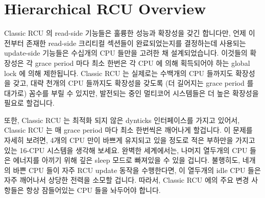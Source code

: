 
\section{Hierarchical RCU Overview}
\label{app:rcuimpl:rcutree:Hierarchical RCU Overview}

Classic RCU 의 read-side 기능들은 훌륭한 성능과 확장성을 갖긴 합니다만, 언제
이전부터 존재한 read-side 크리티컬 섹션들이 완료되었는지를 결정하는데 사용되는
update-side 기능들은 수십개의 CPU 들만을 고려한 채 설계되었습니다.
이것들의 확장성은 각 grace period 마다 최소 한번은 각 CPU 에 의해 획득되어야
하는 global lock 에 의해 제한됩니다.
Classic RCU 는 실제로는 수백개의 CPU 들까지도 확장성을 갖고, 대략 천개의 CPU
들까지도 확장성을 갖도록 (더 길어지는 grace period 를 대가로) 꼼수를 부릴 수
있지만, 발전되는 중인 멀티코어 시스템들은 더 높은 확장성을 필요로 할겁니다.
\iffalse

Although Classic RCU's read-side primitives enjoy excellent
performance and scalability, the update-side primitives, which
determine when pre-existing read-side critical sections have
finished, were designed with only a few tens of CPUs in mind.
Their scalability is limited by a global lock that must be
acquired by each CPU at least once during each grace period.
Although Classic RCU actually scales to a couple of hundred CPUs, and
can be tweaked to scale to roughly a thousand CPUs (but at the expense of
extending grace periods), emerging multicore systems will require
it to scale better.
\fi

또한, Classic RCU 는 최적화 되지 않은 dynticks 인터페이스를 가지고 있어서,
Classic RCU 는 매 grace period 마다 최소 한번씩은 깨어나게 할겁니다.
이 문제를 자세히 보려면, 4개의 CPU 만이 바쁘게 유지되고 있을 정도로 적은
부하만을 가지고 있는 16-CPU 시스템을 생각해 보세요.
완벽한 세계에서는, 나머지 열두개의 CPU 들은 에너지를 아끼기 위해 깊은 sleep
모드로 빠져있을 수 있을 겁니다.
불행히도, 네개의 바쁜 CPU 들이 자주 RCU update 동작을 수행한다면, 이 열두개의
idle CPU 들은 자주 깨어나서 상당한 전력을 소모할 겁니다.
따라서, Classic RCU 에의 주요 변경 사항들은 항상 잠들어있는 CPU 들을 놔두어야
합니다.
\iffalse

In addition, Classic RCU has a sub-optimal dynticks interface,
with the result that Classic RCU will wake up every CPU at least
once per grace period.
To see the problem with this, consider a 16-CPU system that
is sufficiently lightly loaded that it is keeping only four
CPUs busy.
In a perfect world, the remaining twelve CPUs could be put into
deep sleep mode in order to conserve energy.
Unfortunately, if the four busy CPUs are frequently performing
RCU updates, those twelve idle CPUs will be awakened frequently,
wasting significant energy.
Thus, any major change to Classic RCU should also leave sleeping CPUs lie.
\fi

